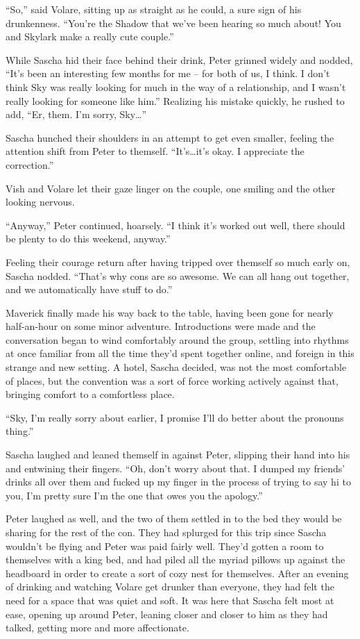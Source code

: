 ``So,'' said Volare, sitting up as straight as he could, a sure sign of his drunkenness. ``You're the Shadow that we've been hearing so much about! You and Skylark make a really cute couple.''

While Sascha hid their face behind their drink, Peter grinned widely and nodded, ``It's been an interesting few months for me -- for both of us, I think. I don't think Sky was really looking for much in the way of a relationship, and I wasn't really looking for someone like him.'' Realizing his mistake quickly, he rushed to add, ``Er, them. I'm sorry, Sky\ldots{}''

Sascha hunched their shoulders in an attempt to get even smaller, feeling the attention shift from Peter to themself. ``It's\ldots{}it's okay. I appreciate the correction.''

Vish and Volare let their gaze linger on the couple, one smiling and the other looking nervous.

``Anyway,'' Peter continued, hoarsely. ``I think it's worked out well, there should be plenty to do this weekend, anyway.''

Feeling their courage return after having tripped over themself so much early on, Sascha nodded. ``That's why cons are so awesome. We can all hang out together, and we automatically have stuff to do.''

Maverick finally made his way back to the table, having been gone for nearly half-an-hour on some minor adventure. Introductions were made and the conversation began to wind comfortably around the group, settling into rhythms at once familiar from all the time they'd spent together online, and foreign in this strange and new setting. A hotel, Sascha decided, was not the most comfortable of places, but the convention was a sort of force working actively against that, bringing comfort to a comfortless place.

\secdiv{}

``Sky, I'm really sorry about earlier, I promise I'll do better about the pronouns thing.''

Sascha laughed and leaned themself in against Peter, slipping their hand into his and entwining their fingers. ``Oh, don't worry about that. I dumped my friends' drinks all over them and fucked up my finger in the process of trying to say hi to you, I'm pretty sure I'm the one that owes you the apology.''

Peter laughed as well, and the two of them settled in to the bed they would be sharing for the rest of the con. They had splurged for this trip since Sascha wouldn't be flying and Peter was paid fairly well. They'd gotten a room to themselves with a king bed, and had piled all the myriad pillows up against the headboard in order to create a sort of cozy nest for themselves. After an evening of drinking and watching Volare get drunker than everyone, they had felt the need for a space that was quiet and soft. It was here that Sascha felt most at ease, opening up around Peter, leaning closer and closer to him as they had talked, getting more and more affectionate.

